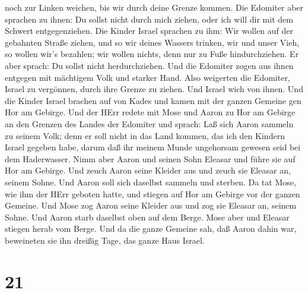 noch zur Linken weichen, bis wir durch deine Grenze kommen.
 Die Edomiter aber sprachen zu ihnen: Du sollst nicht durch
mich ziehen, oder ich will dir mit dem Schwert entgegenziehen.
 Die Kinder Israel sprachen zu ihm: Wir wollen auf der
gebahnten Straße ziehen, und so wir deines Wassers trinken, wir und
unser Vieh, so wollen wir's bezahlen; wir wollen nichts, denn nur zu
Fuße hindurchziehen.  Er aber sprach: Du sollst nicht
herdurchziehen. Und die Edomiter zogen aus ihnen entgegen mit mächtigem
Volk und starker Hand.  Also weigerten die Edomiter, Israel
zu vergönnen, durch ihre Grenze zu ziehen. Und Israel wich von ihnen.
 Und die Kinder Israel brachen auf von Kades und kamen mit
der ganzen Gemeine gen Hor am Gebirge.  Und der HErr redete
mit Mose und Aaron zu Hor am Gebirge an den Grenzen des Landes der
Edomiter und sprach:  Laß sich Aaron sammeln zu seinem
Volk; denn er soll nicht in das Land kommen, das ich den Kindern Israel
gegeben habe, darum daß ihr meinem Munde ungehorsam gewesen seid bei dem
Haderwasser.  Nimm aber Aaron und seinen Sohn Eleasar und
führe sie auf Hor am Gebirge.  Und zeuch Aaron seine
Kleider aus und zeuch sie Eleasar an, seinem Sohne. Und Aaron soll sich
daselbst sammeln und sterben.  Da tat Mose, wie ihm der
HErr geboten hatte, und stiegen auf Hor am Gebirge vor der ganzen
Gemeine.  Und Mose zog Aaron seine Kleider aus und zog sie
Eleasar an, seinem Sohne. Und Aaron starb daselbst oben auf dem Berge.
Mose aber und Eleasar stiegen herab vom Berge.  Und da die
ganze Gemeine sah, daß Aaron dahin war, beweineten sie ihn dreißig Tage,
das ganze Haus Israel.

\hypertarget{section-20}{%
\section{21}\label{section-20}}

